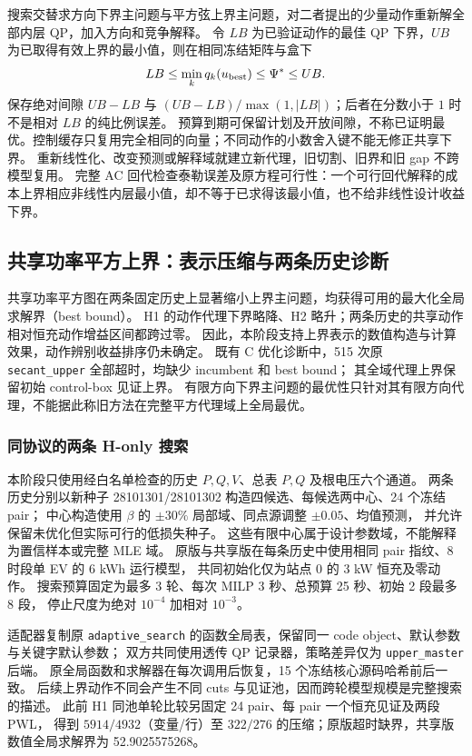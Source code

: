 \documentclass[UTF8,fontset=fandol,11pt,a4paper]{ctexart}
\begin{document}
搜索交替求方向下界主问题与平方弦上界主问题，对二者提出的少量动作重新解全部内层 QP，加入方向和竞争解释。
令 $LB$ 为已验证动作的最佳 QP 下界，$UB$ 为已取得有效上界的最小值，则在相同冻结矩阵与盒下
\begin{equation}
 LB\le\min_kq_k(u_{\rm best})\le\Psi^*\le UB .
 \label{eq:adapt-globalgap}
\end{equation}
保存绝对间隙 $UB-LB$ 与 $(UB-LB)/\max(1,|LB|)$；后者在分数小于 $1$ 时不是相对 $LB$ 的纯比例误差。
预算到期可保留计划及开放间隙，不称已证明最优。控制缓存只复用完全相同的向量；不同动作的小数舍入键不能无修正共享下界。
重新线性化、改变预测或解释域就建立新代理，旧切割、旧界和旧 gap 不跨模型复用。
完整 AC 回代检查泰勒误差及原方程可行性：一个可行回代解释的成本上界相应非线性内层最小值，却不等于已求得该最小值，也不给非线性设计收益下界。

\subsection{共享功率平方上界：表示压缩与两条历史诊断}
\label{sec:shared-power-square-upper}

共享功率平方图在两条固定历史上显著缩小上界主问题，均获得可用的最大化全局求解界（best bound）。
H1 的动作代理下界略降、H2 略升；两条历史的共享动作相对恒充动作增益区间都跨过零。
因此，本阶段支持上界表示的数值构造与计算效果，动作辨别收益排序仍未确定。
既有 C 优化诊断中，515 次原 \texttt{secant\_upper} 全部超时，均缺少 incumbent 和 best bound；
其全域代理上界保留初始 control-box 见证上界。
有限方向下界主问题的最优性只针对其有限方向代理，不能据此称旧方法在完整平方代理域上全局最优。

\subsubsection{同协议的两条 H-only 搜索}
本阶段只使用经白名单检查的历史 $P,Q,V$、总表 $P,Q$ 及根电压六个通道。
两条历史分别以新种子 28101301/28101302 构造四候选、每候选两中心、24 个冻结 pair；
中心构造使用 $\beta$ 的 $\pm30\%$ 局部域、同点源调整 $\pm0.05$、均值预测，
并允许保留未优化但实际可行的低损失种子。
这些有限中心属于设计参数域，不能解释为置信样本或完整 MLE 域。
原版与共享版在每条历史中使用相同 pair 指纹、8 时段单 EV 的 6 kWh 运行模型，
共同初始化仅为站点 0 的 3 kW 恒充及零动作。
搜索预算固定为最多 3 轮、每次 MILP 3 秒、总预算 25 秒、初始 2 段最多 8 段，
停止尺度为绝对 $10^{-4}$ 加相对 $10^{-3}$。

适配器复制原 \texttt{adaptive\_search} 的函数全局表，保留同一 code object、默认参数与关键字默认参数；
双方共同使用透传 QP 记录器，策略差异仅为 \texttt{upper\_master} 后端。
原全局函数和求解器在每次调用后恢复，15 个冻结核心源码哈希前后一致。
后续上界动作不同会产生不同 cuts 与见证池，因而跨轮模型规模是完整搜索的描述。
此前 H1 同池单轮比较另固定 24 pair、每 pair 一个恒充见证及两段 PWL，
得到 $5914/4932$（变量/行）至 $322/276$ 的压缩；原版超时缺界，共享版数值全局求解界为 52.9025575268。
\end{document}
